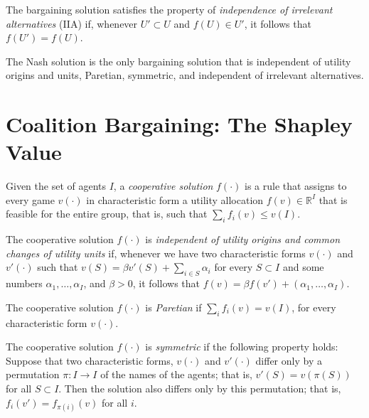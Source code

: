 \begin{defn}
    The bargaining solution satisfies the property of \emph{independence of irrelevant alternatives} (IIA) if, whenever $U' \subset U$ and $f(U) \in U'$, it follows that $f(U') = f(U)$.
\end{defn}

\begin{prop}
    The Nash solution is the only bargaining solution that is independent of utility origins and units, Paretian, symmetric, and independent of irrelevant alternatives.
\end{prop}


\section{Coalition Bargaining: The Shapley Value}

\begin{defn}
    Given the set of agents $I$, a \emph{cooperative solution} $f(\cdot)$ is a rule that assigns to every game $v(\cdot)$ in characteristic form a utility allocation $f(v) \in \mathbb{R}^I$ that is feasible for the entire group, that is, such that $\sum_i f_i(v) \leq v(I)$.
\end{defn}

\begin{defn}
    The cooperative solution $f(\cdot)$ is \emph{independent of utility origins and common changes of utility units} if, whenever we have two characteristic forms $v(\cdot)$ and $v'(\cdot)$ such that $v(S) = \beta v'(S) + \sum_{i \in S} \alpha_i$ for every $S \subset I$ and some numbers $\alpha_1, \dots, \alpha_I$, and $\beta > 0$, it follows that $f(v) = \beta f(v') + (\alpha_1, \dots, \alpha_I)$.
\end{defn}

\begin{defn}
    The cooperative solution $f(\cdot)$ is \emph{Paretian} if $\sum_i f_i(v) = v(I)$, for every characteristic form $v(\cdot)$.
\end{defn}

\begin{defn}
    The cooperative solution $f(\cdot)$ is \emph{symmetric} if the following property holds: Suppose that two characteristic forms, $v(\cdot)$ and $v'(\cdot)$ differ only by a permutation $\pi : I \to I$ of the names of the agents; that is, $v'(S) = v(\pi(S))$ for all $S \subset I$. Then the solution also differs only by this permutation; that is, $f_i(v') = f_{\pi(i)}(v)$ for all $i$.
\end{defn}


